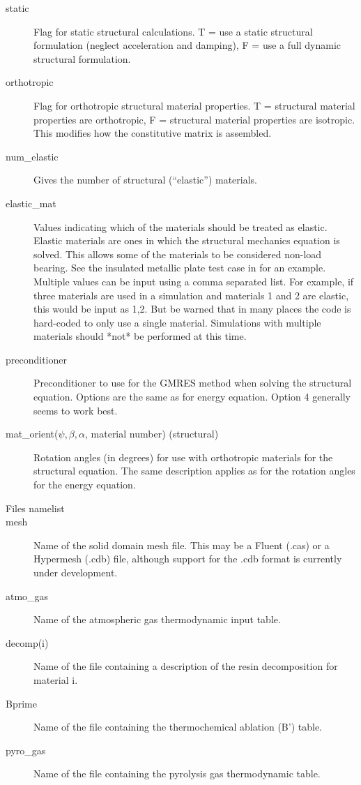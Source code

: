 \documentclass[]{article}
\begin{document}
\begin{description}
\item[static] Flag for static structural calculations. T = use a static structural formulation (neglect acceleration and damping), F = use a full dynamic structural formulation.
\item[orthotropic] Flag for orthotropic structural material properties. T = structural material properties are orthotropic, F = structural material properties are isotropic. This modifies how the constitutive matrix is assembled.
\item[num\_elastic] Gives the number of structural (``elastic'') materials.
\item[elastic\_mat] Values indicating which of the materials should be treated as elastic. Elastic materials are ones in which the structural mechanics equation is solved. This allows some of the materials to be considered non-load bearing. See the insulated metallic plate test case in \cite{wiebenga_thesis} for an example. Multiple values can be input using a comma separated list. For example, if three materials are used in a simulation and materials 1 and 2 are elastic, this would be input as 1,2. But be warned that in many places the
code is hard-coded to only use a single material. Simulations with multiple materials should *not* be performed at this time.
\item[preconditioner] Preconditioner to use for the GMRES method when solving the structural equation. Options are the same as for energy equation. Option 4 generally seems to work best.
\item[mat\_orient($\psi,\beta,\alpha$, material number) (structural)] Rotation angles (in degrees) for use with orthotropic materials for the structural equation. The same description applies as for the rotation angles for the energy equation.
\\
\item[Files namelist]
\item[mesh] Name of the solid domain mesh file.  This may be a Fluent (.cas) or a Hypermesh (.cdb) file, although support for the .cdb format is currently under development.
\item[atmo\_gas] Name of the atmospheric gas thermodynamic input table.
\item[decomp(i)] Name of the file containing a description of the resin decomposition for material i.
\item[Bprime] Name of the file containing the thermochemical ablation (B') table.
\item[pyro\_gas] Name of the file containing the pyrolysis gas thermodynamic table.

\end{description}
\end{document}
